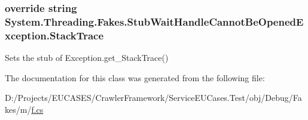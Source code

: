 \hypertarget{class_system_1_1_threading_1_1_fakes_1_1_stub_wait_handle_cannot_be_opened_exception_aad4dcee933a0dddbc0e07e7ee620d69a}{
\subsubsection[{Stack\-Trace}]{\setlength{\rightskip}{0pt plus 5cm}override string System.\-Threading.\-Fakes.\-Stub\-Wait\-Handle\-Cannot\-Be\-Opened\-Exception.\-Stack\-Trace\hspace{0.3cm}{\ttfamily [get]}}}\label{class_system_1_1_threading_1_1_fakes_1_1_stub_wait_handle_cannot_be_opened_exception_aad4dcee933a0dddbc0e07e7ee620d69a}


Sets the stub of Exception.\-get\-\_\-\-Stack\-Trace()



The documentation for this class was generated from the following file\-:\begin{DoxyCompactItemize}
\item 
D\-:/\-Projects/\-E\-U\-C\-A\-S\-E\-S/\-Crawler\-Framework/\-Service\-E\-U\-Cases.\-Test/obj/\-Debug/\-Fakes/m/\hyperlink{m_2f_8cs}{f.\-cs}\end{DoxyCompactItemize}
